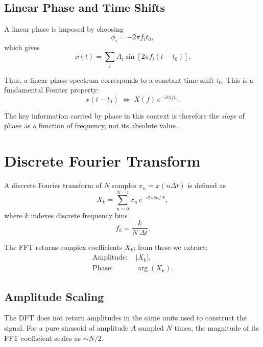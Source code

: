 \documentclass[11pt,a4paper]{article}
\begin{document}
\subsection{Linear Phase and Time Shifts}

A linear phase is imposed by choosing
\begin{equation}
\phi_i = -2\pi f_i t_0,
\end{equation}
which gives
\begin{equation}
x(t) = \sum_i A_i \sin\!\left[2\pi f_i (t - t_0)\right].
\end{equation}

Thus, a linear phase spectrum corresponds to a constant time shift $t_0$.
This is a fundamental Fourier property:
\begin{equation}
x(t - t_0) \;\Longleftrightarrow\; X(f)\,e^{-i 2\pi f t_0}.
\end{equation}

The key information carried by phase in this context is therefore the \emph{slope} of phase as a function of frequency, not its absolute value.

\section{Discrete Fourier Transform}

A discrete Fourier transform of $N$ samples $x_n = x(n\Delta t)$ is defined as
\begin{equation}
X_k = \sum_{n=0}^{N-1} x_n \, e^{-i 2\pi kn/N},
\end{equation}
where $k$ indexes discrete frequency bins
\begin{equation}
f_k = \frac{k}{N\,\Delta t}.
\end{equation}

The FFT returns complex coefficients $X_k$; from these we extract:
\begin{align}
\text{Amplitude: } & |X_k|, \\
\text{Phase: } & \arg(X_k).
\end{align}

\subsection{Amplitude Scaling}

The DFT does not return amplitudes in the same units used to construct the signal.
For a pure sinusoid of amplitude $A$ sampled $N$ times, the magnitude of its FFT coefficient scales as $\sim N/2$.
\end{document}

